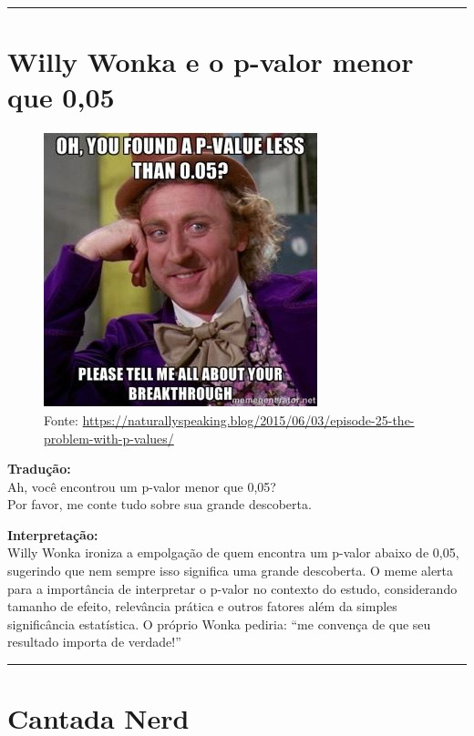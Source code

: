 \documentclass[
]{book}
\begin{document}
\begin{center}\rule{0.5\linewidth}{0.5pt}\end{center}

\section{Willy Wonka e o p-valor menor que 0,05}\label{willy-wonka-e-o-p-valor-menor-que-005}

\begin{figure}
\centering
\includegraphics{p-values1.jpg}
\caption{Fonte: \url{https://naturallyspeaking.blog/2015/06/03/episode-25-the-problem-with-p-values/}}
\end{figure}

\textbf{Tradução:}\\
Ah, você encontrou um p-valor menor que 0,05?\\
Por favor, me conte tudo sobre sua grande descoberta.

\textbf{Interpretação:}\\
Willy Wonka ironiza a empolgação de quem encontra um p-valor abaixo de 0,05, sugerindo que nem sempre isso significa uma grande descoberta. O meme alerta para a importância de interpretar o p-valor no contexto do estudo, considerando tamanho de efeito, relevância prática e outros fatores além da simples significância estatística. O próprio Wonka pediria: ``me convença de que seu resultado importa de verdade!''

\begin{center}\rule{0.5\linewidth}{0.5pt}\end{center}

\section{Cantada Nerd}\label{cantada-nerd}
\end{document}
